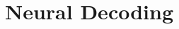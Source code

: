 \chapter{ Neural Decoding}
\label{cha:Neural Decoding}

\begin{multicols}{2}
\setlength{\columnseprule}{0.2pt}  









\end{multicols}

